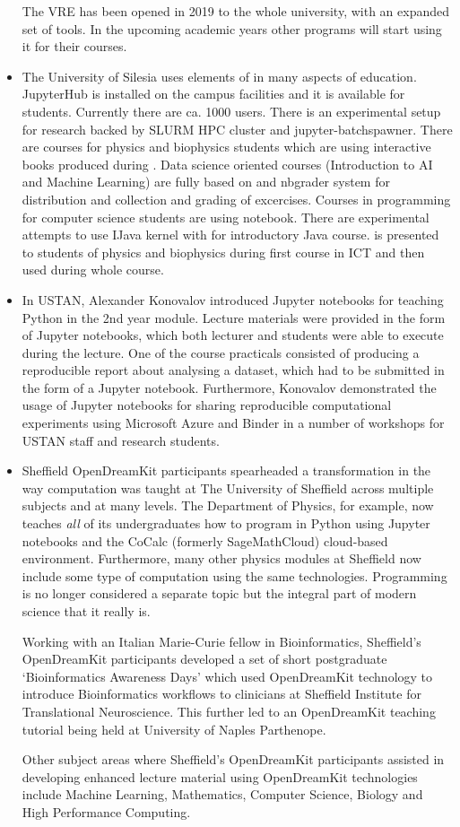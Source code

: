 \documentclass{deliverablereport}
\begin{document}
\begin{itemize}
  The VRE has been opened in 2019 to the whole university, with an
  expanded set of tools. In the upcoming academic years other programs
  will start using it for their courses.
\item
  The University of Silesia uses elements of \ODK in many aspects of
  education. JupyterHub is installed on the campus facilities and it
  is available for students. Currently there are ca. 1000
  users. There is an experimental setup for research backed by SLURM
  HPC cluster and jupyter-batchspawner. There are courses for physics
  and biophysics students which are using interactive books produced
  during \ODK. Data science oriented courses (Introduction to AI and
  Machine Learning) are fully based on \Jupyter and nbgrader system for
  distribution and collection and grading of excercises. Courses in
  \Python programming for computer science students are using \Jupyter
  notebook. There are experimental attempts to use IJava kernel with
  \Jupyter for introductory Java course. \SageMath is presented to
  students of physics and biophysics during first course in ICT and
  then used during whole course. 
\item
  In USTAN, Alexander Konovalov introduced Jupyter notebooks
  for teaching Python in the 2nd year module. Lecture materials 
  were provided in the form of Jupyter notebooks, which both lecturer
  and students were able to execute during the lecture. One of the
  course practicals consisted of producing a reproducible report
  about analysing a dataset, which had to be submitted in the form
  of a Jupyter notebook. Furthermore, Konovalov demonstrated the usage
  of Jupyter notebooks for sharing reproducible computational 
  experiments using Microsoft Azure and Binder in a number of 
  workshops for USTAN staff and research students.
\item
  Sheffield OpenDreamKit participants spearheaded a transformation in
  the way computation was taught at The University of Sheffield across
  multiple subjects and at many levels. The Department of Physics, for
  example, now teaches \emph{all} of its undergraduates how to program
  in Python using Jupyter notebooks and the CoCalc (formerly
  SageMathCloud) cloud-based environment. Furthermore, many other
  physics modules at Sheffield now include some type of computation
  using the same technologies. Programming is no longer considered
  a separate topic but the integral part of modern science that it really
  is.

  Working with an Italian Marie-Curie fellow in Bioinformatics,
  Sheffield's OpenDreamKit participants developed a set of short
  postgraduate `Bioinformatics Awareness Days' which used OpenDreamKit
  technology to introduce Bioinformatics workflows to clinicians at
  Sheffield Institute for Translational Neuroscience. This further led
  to an OpenDreamKit teaching tutorial being held at University of
  Naples Parthenope.

  Other subject areas where Sheffield's OpenDreamKit participants
  assisted in developing enhanced lecture material using OpenDreamKit
  technologies include Machine Learning, Mathematics, Computer Science,
  Biology and High Performance Computing.
\end{itemize}
\end{document}
